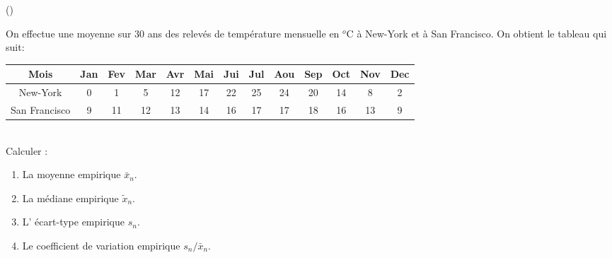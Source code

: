 \begin{exercice}\label{exo1-4} (\minsyndical)

On effectue une moyenne sur 30 ans des relev\'es de temp\'erature mensuelle en 
$^o$C \`a New-York et \`a San Francisco. On obtient le tableau qui suit:\\

\begin{tabular}{|c|cccccccccccc|}
\hline
Mois & Jan & Fev & Mar & Avr & Mai & Jui & Jul & Aou & Sep & Oct & Nov & Dec \\ \hline
New-York & 0 & 1 & 5 & 12 & 17 & 22 & 25 & 24 & 20 & 14 & 8 & 2 \\ \hline
San Francisco & 9 & 11 & 12 & 13 & 14 & 16 & 17 & 17 & 18  & 16 & 13 & 9 \\ \hline
\end{tabular}\\

Calculer :

\begin{enumerate}

\item La moyenne empirique $\bar{x}_n$.

\item La m\'ediane empirique $\tilde{x}_n$.

\item L' \'ecart-type empirique $s_n$.

\item Le coefficient de variation empirique $s_n / \bar{x}_n$.


\end{enumerate}


\end{exercice}
